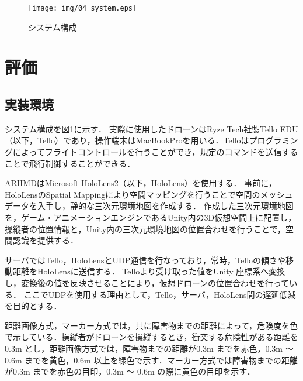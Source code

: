 \documentclass[submit]{ipsj}
\begin{document}

\begin{figure}[tb]
  \centering
  \texttt{[image: img/04\_system.eps]}
  \caption{システム構成}
  \label{fig:04_system}
\end{figure}
  

\section{評価}

\subsection{実装環境}
システム構成を図\ref{fig:04_system}に示す．
実際に使用したドローンはRyze Tech社製Tello EDU（以下，Tello）であり，操作端末はMacBookProを用いる．Telloはプログラミングによってフライトコントロールを行うことができ，規定のコマンドを送信することで飛行制御することができる．
\par
ARHMDはMicrosoft HoloLens2（以下，HoloLens）を使用する．
事前に，HoloLensのSpatial Mappingにより空間マッピングを行うことで空間のメッシュデータを入手し，静的な三次元環境地図を作成する．
作成した三次元環境地図を，ゲーム・アニメーションエンジンであるUnity内の3D仮想空間上に配置し，操縦者の位置情報と，Unity内の三次元環境地図の位置合わせを行うことで，空間認識を提供する．
\par
サーバではTello，HoloLensとUDP通信\cite{web-udp}を行なっており，常時，Telloの傾きや移動距離をHoloLensに送信する．
Telloより受け取った値をUnity 座標系へ変換し，変換後の値を反映させることにより，仮想ドローンの位置合わせを行っている．
ここでUDPを使用する理由として，Tello，サーバ，HoloLens間の遅延低減を目的とする．
\par
距離画像方式，マーカー方式では，共に障害物までの距離によって，危険度を色で示している．操縦者がドローンを操縦するとき，衝突する危険性がある距離を0.3m とし\cite{tech-01}，距離画像方式では，障害物までの距離が0.3m までを赤色，0.3m 〜 0.6m までを黄色，0.6m 以上を緑色で示す．マーカー方式では障害物までの距離が0.3m までを赤色の目印，0.3m 〜 0.6m の際に黄色の目印を示す．
\end{document}
